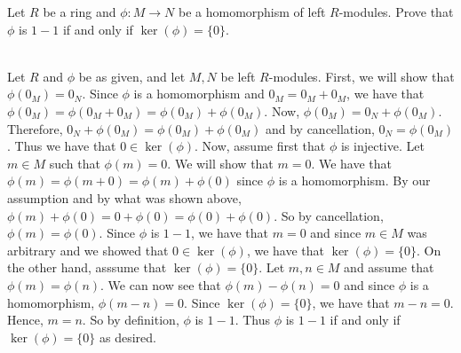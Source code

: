 Let $R$ be a ring and $\phi:M\rightarrow N$ be a homomorphism of left $R$-modules. Prove that
$\phi$ is $1-1$ if and only if $\ker(\phi)=\{0\}$.

\begin{solution}\renewcommand{\qedsymbol}{}\ \\
    Let $R$ and $\phi$ be as given, and let $M,N$ be left $R$-modules. First, we will show that
    $\phi(0_M)=0_N$. Since $\phi$ is a homomorphism and $0_M=0_M+0_M$, we have that
    $\phi(0_M)=\phi(0_M+0_M)=\phi(0_M)+\phi(0_M)$. Now, $\phi(0_M)=0_N+\phi(0_M)$. Therefore,
    $0_N+\phi(0_M)=\phi(0_M)+\phi(0_M)$ and by cancellation, $0_N=\phi(0_M)$. Thus we have that
    $0\in\ker(\phi)$. Now, assume first that $\phi$ is injective. Let $m\in M$ such that $\phi(m)=0$.
    We will show that $m=0$. We have that $\phi(m)=\phi(m+0)=\phi(m)+\phi(0)$ since $\phi$ is a
    homomorphism. By our assumption and by what was shown above,
    $\phi(m)+\phi(0)=0+\phi(0)=\phi(0)+\phi(0)$. So by cancellation, $\phi(m)=\phi(0)$. Since
    $\phi$ is $1-1$, we have that $m=0$ and since $m\in M$ was arbitrary and we showed that
    $0\in\ker(\phi)$, we have that $\ker(\phi)=\{0\}$. On the other hand, asssume that
    $\ker(\phi)=\{0\}$. Let $m,n\in M$ and assume that $\phi(m)=\phi(n)$. We can now see that
    $\phi(m)-\phi(n)=0$ and since $\phi$ is a homomorphism, $\phi(m-n)=0$. Since $\ker(\phi)=\{0\}$, we
    have that $m-n=0$. Hence, $m=n$. So by definition, $\phi$ is $1-1$. Thus $\phi$ is $1-1$ if and only
    if $\ker(\phi)=\{0\}$ as desired.

\end{solution}